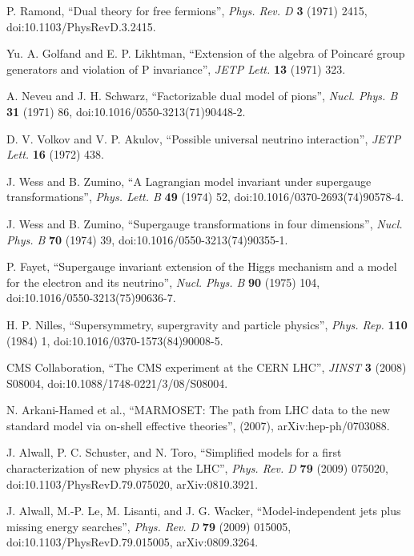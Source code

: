 \begin{thebibliography}{9}
P. Ramond, “Dual theory for free fermions”, {\it Phys. Rev. D} {\bf 3} (1971) 2415, doi:10.1103/PhysRevD.3.2415.

Yu. A. Golfand and E. P. Likhtman, “Extension of the algebra of Poincar\'e group generators and violation of P invariance”, {\it JETP Lett.} {\bf 13} (1971) 323.

A. Neveu and J. H. Schwarz, “Factorizable dual model of pions”, { \it Nucl. Phys. B} {\bf 31} (1971) 86, doi:10.1016/0550-3213(71)90448-2.

D. V. Volkov and V. P. Akulov, “Possible universal neutrino interaction”, { \it JETP Lett.} {\bf 16} (1972) 438.

J. Wess and B. Zumino, “A Lagrangian model invariant under supergauge transformations”, {\it Phys. Lett. B} {\bf 49} (1974) 52, doi:10.1016/0370-2693(74)90578-4.

J. Wess and B. Zumino, “Supergauge transformations in four dimensions”, {\it Nucl. Phys. B} {\bf 70} (1974) 39, doi:10.1016/0550-3213(74)90355-1.

P. Fayet, “Supergauge invariant extension of the Higgs mechanism and a model for the electron and its neutrino”, {\it Nucl. Phys. B} {\bf 90} (1975) 104, doi:10.1016/0550-3213(75)90636-7.

H. P. Nilles, “Supersymmetry, supergravity and particle physics”, {\it Phys. Rep.} {\bf 110} (1984) 1, doi:10.1016/0370-1573(84)90008-5.

CMS Collaboration, “The CMS experiment at the CERN LHC”, {\it JINST} {\bf 3} (2008) S08004, doi:10.1088/1748-0221/3/08/S08004.

N. Arkani-Hamed et al., “MARMOSET: The path from LHC data to the new standard model via on-shell effective theories”, (2007), arXiv:hep-ph/0703088.

J. Alwall, P. C. Schuster, and N. Toro, “Simplified models for a first characterization of new physics at the LHC”, {\it Phys. Rev. D} \textbf{79} (2009) 075020, doi:10.1103/PhysRevD.79.075020, arXiv:0810.3921.

J. Alwall, M.-P. Le, M. Lisanti, and J. G. Wacker, “Model-independent jets plus missing energy searches”, {\it Phys. Rev. D} {\bf 79} (2009) 015005, doi:10.1103/PhysRevD.79.015005, arXiv:0809.3264.


\end{thebibliography}
